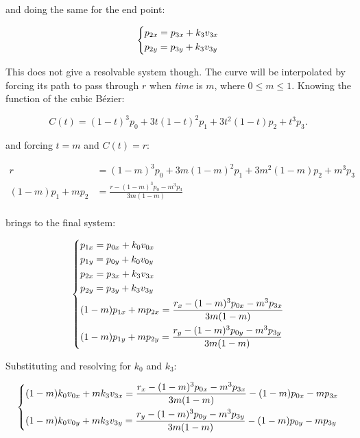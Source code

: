 \documentclass{scrartcl}
\begin{document}
and doing the same for the end point:

\begin{equation*}
\begin{dcases}
    p_{2x} = p_{3x} + k_3 v_{3x} \\
    p_{2y} = p_{3y} + k_3 v_{3y} \\
\end{dcases}
\end{equation*}

This does not give a resolvable system though. The curve will be
interpolated by forcing its path to pass through $r$ when
\textit{time} is $m$, where $0 \leq m \leq 1$. Knowing the function of
the cubic Bézier:

\begin{equation*}
C(t) = (1-t)^3p_0 + 3t(1-t)^2p_1 + 3t^2(1-t)p_2 + t^3p_3.
\end{equation*}

and forcing $t = m$ and $C(t) = r$:

\begin{equation*}
\begin{split}
    r &= (1-m)^3 p_0 + 3m(1-m)^2 p_1 + 3m^2 (1-m) p_2 + m^3 p_3 \\
    (1-m) p_1 + m p_2 &= \frac{r - (1-m)^3p_0 - m^3p_3}{3m (1-m)} \\
\end{split}
\end{equation*}

brings to the final system:

\begin{equation*}
\begin{dcases}
    p_{1x} = p_{0x} + k_0 v_{0x} \\
    p_{1y} = p_{0y} + k_0 v_{0y} \\
    p_{2x} = p_{3x} + k_3 v_{3x} \\
    p_{2y} = p_{3y} + k_3 v_{3y} \\
    (1-m) p_{1x} + m p_{2x} = \frac{r_x - (1-m)^3 p_{0x} - m^3 p_{3x}}{3m (1-m)} \\
    (1-m) p_{1y} + m p_{2y} = \frac{r_y - (1-m)^3 p_{0y} - m^3 p_{3y}}{3m (1-m)} \\
\end{dcases}
\end{equation*}

Substituting and resolving for $k_0$ and $k_3$:

\begin{equation*}
\begin{dcases}
    (1-m) k_0 v_{0x} + m k_3 v_{3x} = \frac{r_x - (1-m)^3 p_{0x} - m^3 p_{3x}}{3m (1-m)} - (1-m) p_{0x} - m p_{3x} \\
    (1-m) k_0 v_{0y} + m k_3 v_{3y} = \frac{r_y - (1-m)^3 p_{0y} - m^3 p_{3y}}{3m (1-m)} - (1-m) p_{0y} - m p_{3y} \\
\end{dcases}
\end{equation*}
\end{document}
